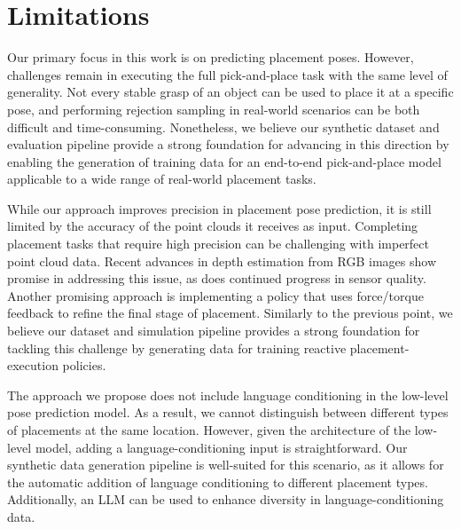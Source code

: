 \section{Limitations}

Our primary focus in this work is on predicting placement poses. However, challenges remain in executing the full pick-and-place task with the same level of generality. Not every stable grasp of an object can be used to place it at a specific pose, and performing rejection sampling in real-world scenarios can be both difficult and time-consuming. Nonetheless, we believe our synthetic dataset and evaluation pipeline provide a strong foundation for advancing in this direction by enabling the generation of training data for an end-to-end pick-and-place model applicable to a wide range of real-world placement tasks.

While our approach improves precision in placement pose prediction, it is still limited by the accuracy of the point clouds it receives as input. Completing placement tasks that require high precision can be challenging with imperfect point cloud data. Recent advances in depth estimation from RGB images show promise in addressing this issue, as does continued progress in sensor quality. Another promising approach is implementing a policy that uses force/torque feedback to refine the final stage of placement. Similarly to the previous point, we believe our dataset and simulation pipeline provides a strong foundation for tackling this challenge by generating data for training reactive placement-execution policies.


The approach we propose does not include language conditioning in the low-level pose prediction model. As a result, we cannot distinguish between different types of placements at the same location. However, given the architecture of the low-level model, adding a language-conditioning input is straightforward. Our synthetic data generation pipeline is well-suited for this scenario, as it allows for the automatic addition of language conditioning to different placement types. Additionally, an LLM can be used to enhance diversity in language-conditioning data.
